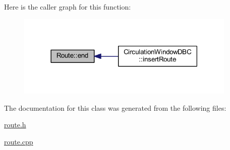 Here is the caller graph for this function\+:
\nopagebreak
\begin{figure}[H]
\begin{center}
\leavevmode
\includegraphics[width=297pt]{class_route_afd80ce5371e7457f278b9c0fd0de79a9_icgraph}
\end{center}
\end{figure}




The documentation for this class was generated from the following files\+:\begin{DoxyCompactItemize}
\item 
\hyperlink{route_8h}{route.\+h}\item 
\hyperlink{route_8cpp}{route.\+cpp}\end{DoxyCompactItemize}
